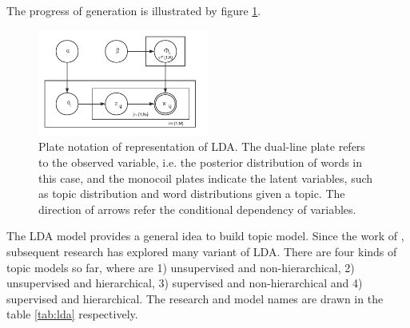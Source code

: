 The progress of generation is illustrated by figure \ref{fig:lda}.

\begin{figure}[!htb]
    \centering
    \includegraphics[width=0.5\textwidth]{fig/lda.pdf}
    \caption{Plate notation of representation of LDA. The dual-line plate refers to the observed variable, i.e. the posterior distribution of words in this case, and the monocoil plates indicate the latent variables, such as topic distribution and word distributions given a topic. The direction of arrows refer the conditional dependency of variables. }
    \label{fig:lda}
\end{figure}

The LDA model provides a general idea to build topic model. Since the work of \cite{Blei:2003}, subsequent research has explored many variant of LDA. There are four kinds of topic models so far, where are 1) unsupervised and non-hierarchical, 2) unsupervised and hierarchical, 3) supervised and non-hierarchical and 4) supervised and hierarchical. The research and model names are drawn in the table \ref{tab:lda} respectively.

\begin{table}[!htb]
\centering
{}
\caption{Topic Models Variant of LDA}
\label{tab:lda}
\end{table}

